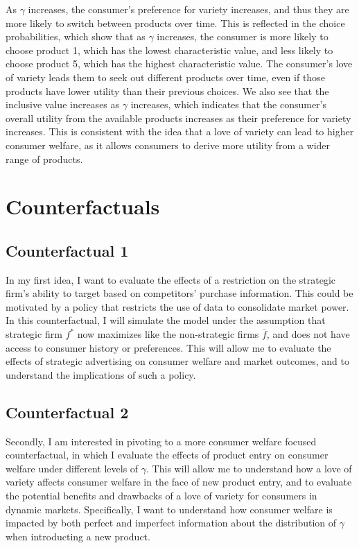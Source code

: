 \documentclass[12pt]{article}
\begin{document}
    As $\gamma$ increases, the consumer's preference for variety increases, and thus they are more likely to switch between products over time. This is reflected in the choice probabilities, which show that as $\gamma$ increases, the consumer is more likely to choose product 1, which has the lowest characteristic value, and less likely to choose product 5, which has the highest characteristic value. The consumer's love of variety leads them to seek out different products over time, even if those products have lower utility than their previous choices. We also see that the inclusive value increases as $\gamma$ increases, which indicates that the consumer's overall utility from the available products increases as their preference for variety increases. This is consistent with the idea that a love of variety can lead to higher consumer welfare, as it allows consumers to derive more utility from a wider range of products.


\section{Counterfactuals}

    \subsection{Counterfactual 1}

    In my first idea, I want to evaluate the effects of a restriction on the strategic firm's ability to target based on competitors' purchase information. This could be motivated by a policy that restricts the use of data to consolidate market power. In this counterfactual, I will simulate the model under the assumption that strategic firm $f^*$ now maximizes like the non-strategic firms $\bar{f}$, and does not have access to consumer history or preferences. This will allow me to evaluate the effects of strategic advertising on consumer welfare and market outcomes, and to understand the implications of such a policy.

    \subsection{Counterfactual 2}

    Secondly, I am interested in pivoting to a more consumer welfare focused counterfactual, in which I evaluate the effects of product entry on consumer welfare under different levels of $\gamma$. This will allow me to understand how a love of variety affects consumer welfare in the face of new product entry, and to evaluate the potential benefits and drawbacks of a love of variety for consumers in dynamic markets. Specifically, I want to understand how consumer welfare is impacted by both perfect and imperfect information about the distribution of $\gamma$ when introducting a new product.
\end{document}
